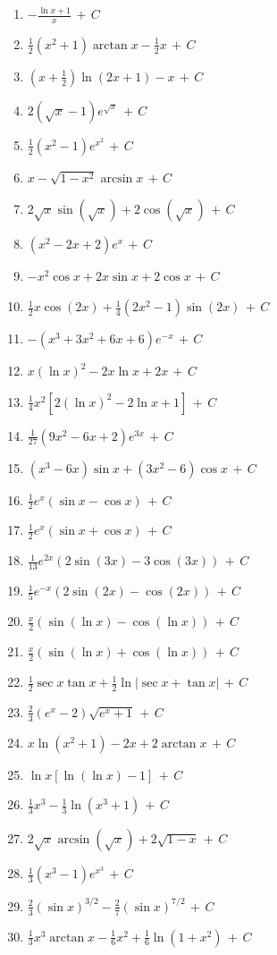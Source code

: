 \documentclass[12pt, letterpaper]{article}
\newcommand{\CC}{\,+\,C}
\begin{document}
\begin{enumerate}[leftmargin=*, label=\textbf{\arabic*.}]
  \item $-\frac{\ln x + 1}{x} \CC$
  \item $\frac{1}{2}(x^2+1)\arctan x - \frac{1}{2}x \CC$
  \item $\left(x+\frac{1}{2}\right)\ln(2x+1) - x \CC$
  \item $2(\sqrt{x}-1)e^{\sqrt{x}} \CC$
  \item $\frac{1}{2}(x^2-1)e^{x^2} \CC$
  \item $x - \sqrt{1-x^2}\arcsin x \CC$
  \item $2\sqrt{x}\sin(\sqrt{x}) + 2\cos(\sqrt{x}) \CC$
  \item $(x^2 - 2x + 2)e^x \CC$
  \item $-x^2\cos x + 2x\sin x + 2\cos x \CC$
  \item $\frac{1}{2}x\cos(2x) + \frac{1}{4}(2x^2-1)\sin(2x) \CC$
  \item $-(x^3 + 3x^2 + 6x + 6)e^{-x} \CC$
  \item $x(\ln x)^2 - 2x\ln x + 2x \CC$
  \item $\frac{1}{4}x^2\left[2(\ln x)^2 - 2\ln x + 1\right] \CC$
  \item $\frac{1}{27}(9x^2 - 6x + 2)e^{3x} \CC$
  \item $(x^3 - 6x)\sin x + (3x^2 - 6)\cos x \CC$
  \item $\frac{1}{2}e^x(\sin x - \cos x) \CC$
  \item $\frac{1}{2}e^x(\sin x + \cos x) \CC$
  \item $\frac{1}{13}e^{2x}(2\sin(3x) - 3\cos(3x)) \CC$
  \item $\frac{1}{5}e^{-x}(2\sin(2x) - \cos(2x)) \CC$
  \item $\frac{x}{2}(\sin(\ln x) - \cos(\ln x)) \CC$
  \item $\frac{x}{2}(\sin(\ln x) + \cos(\ln x)) \CC$
  \item $\frac{1}{2}\sec x\tan x + \frac{1}{2}\ln|\sec x + \tan x| \CC$
  \item $\frac{2}{3}(e^x-2)\sqrt{e^x+1} \CC$
  \item $x\ln(x^2+1) - 2x + 2\arctan x \CC$
  \item $\ln x[\ln(\ln x) - 1] \CC$
  \item $\frac{1}{3}x^3 - \frac{1}{3}\ln(x^3+1) \CC$
  \item $2\sqrt{x}\arcsin(\sqrt{x}) + 2\sqrt{1-x} \CC$
  \item $\frac{1}{3}(x^3-1)e^{x^3} \CC$
  \item $\frac{2}{3}(\sin x)^{3/2} - \frac{2}{7}(\sin x)^{7/2} \CC$
  \item $\frac{1}{3}x^3\arctan x - \frac{1}{6}x^2 + \frac{1}{6}\ln(1+x^2) \CC$

\end{enumerate}
\end{document}
